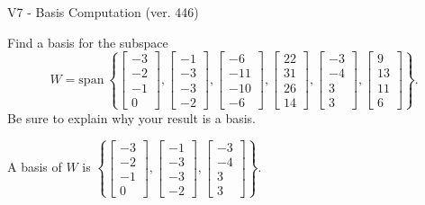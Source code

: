 \begin{exercise}
  \begin{exerciseTitle}V7 - Basis Computation (ver. 446)\end{exerciseTitle}
  \begin{exerciseStatement}
    Find a basis for the subspace 
\[W=\mathrm{span}\ \left\{\left[\begin{array}{r}
-3 \\
-2 \\
-1 \\
0
\end{array}\right] , \left[\begin{array}{r}
-1 \\
-3 \\
-3 \\
-2
\end{array}\right] , \left[\begin{array}{r}
-6 \\
-11 \\
-10 \\
-6
\end{array}\right] , \left[\begin{array}{r}
22 \\
31 \\
26 \\
14
\end{array}\right] , \left[\begin{array}{r}
-3 \\
-4 \\
3 \\
3
\end{array}\right] , \left[\begin{array}{r}
9 \\
13 \\
11 \\
6
\end{array}\right]\right\}.\]
 Be sure to explain why your result is a basis.


  \end{exerciseStatement}
  \begin{exerciseAnswer}
   A basis of \(W\) is  \(\left\{\left[\begin{array}{r}
-3 \\
-2 \\
-1 \\
0
\end{array}\right] , \left[\begin{array}{r}
-1 \\
-3 \\
-3 \\
-2
\end{array}\right] , \left[\begin{array}{r}
-3 \\
-4 \\
3 \\
3
\end{array}\right]\right\}\).
  


  \end{exerciseAnswer}
\end{exercise}